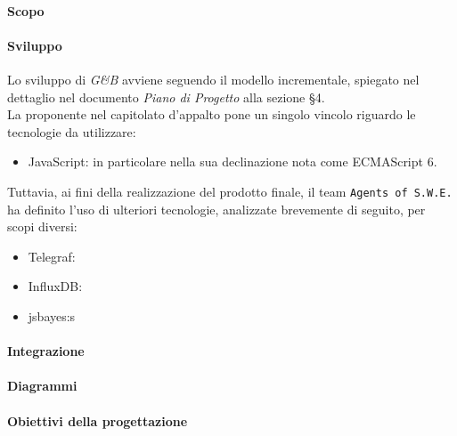 \paragraph{Scopo}

\paragraph{Sviluppo}
Lo sviluppo di \textit{G\&B} avviene seguendo il modello incrementale, spiegato nel dettaglio nel documento \textit{Piano di Progetto} alla sezione §4.\\
La proponente nel capitolato d'appalto pone un singolo vincolo riguardo le tecnologie da utilizzare:
\begin{itemize}
	\item JavaScript: in particolare nella sua declinazione nota come ECMAScript 6\glossario.
\end{itemize}
Tuttavia, ai fini della realizzazione del prodotto finale, il team \texttt{Agents of S.W.E.} ha definito l'uso di ulteriori tecnologie, analizzate brevemente di seguito, per scopi diversi:
\begin{itemize} 
	\item Telegraf\glossario:
	\item InfluxDB\glossario:
	\item jsbayes\glossario:s
\end{itemize}


\paragraph{Integrazione}

\paragraph{Diagrammi}

\paragraph{Obiettivi della progettazione}